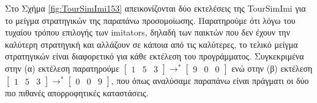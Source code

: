 \documentclass[12pt]{article}
\begin{document}
Στο Σχήμα \ref{fig:TourSimImi153} απεικονίζονται δύο εκτελέσεις της TourSimImi για το μείγμα στρατηγικών της παραπάνω προσομοίωσης. Παρατηρούμε ότι λόγω του τυχαίου τρόπου επιλογής των imitators, δηλαδή των παικτών που δεν έχουν την καλύτερη στρατηγική και αλλάζουν σε κάποια από τις καλύτερες, το τελικό μείγμα στρατηγικών είναι διαφορετικό για κάθε εκτέλεση του προγράμματος. Συγκεκριμένα στην (α) εκτέλεση παρατηρούμε $\begin{bmatrix}1&5&3\end{bmatrix} \rightarrow^* \begin{bmatrix}9&0&0\end{bmatrix}$ ενώ στην (β) εκτέλεση $\begin{bmatrix}1&5&3\end{bmatrix} \rightarrow^*	\begin{bmatrix}0&0&9\end{bmatrix}$, που όπως αναλύσαμε παραπάνω είναι πράγματι οι δύο πιο πιθανές απορροφητικές καταστάσεις.
\end{document}
